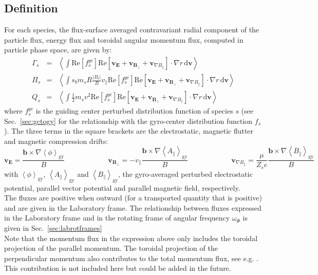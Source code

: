 \documentclass[a4paper]{report}
\begin{document}
\subsection{Definition}
For each species, the flux-surface averaged contravariant radial component of the particle flux, energy flux and toroidal angular momentum flux, computed in particle phase space, are given by:
\begin{eqnarray}
 \Gamma_s &=& \left<\int \textrm{Re}\left[f_s^{gc}\right] \textrm{Re}\left[\mathbf{v}_\mathbf{E} + \mathbf{v}_{\mathbf{B}_\perp} + \mathbf{v}_{\nabla B_\parallel}  \right]\cdot \nabla r\,\textrm{d}\mathbf{v}\right> \\
  \Pi_s   &=& \left<\int s_b m_s R \frac{|B_t|}{B}v_\parallel \textrm{Re}\left[f_s^{gc}\right] \textrm{Re}  \left[\mathbf{v}_\mathbf{E} + \mathbf{v}_{\mathbf{B}_\perp} + \mathbf{v}_{\nabla B_\parallel}  \right] \cdot \nabla r\,\textrm{d}\mathbf{v}\right> \\
      Q_s &=& \left<\int \frac{1}{2}m_sv^2 \textrm{Re}\left[f_s^{gc}\right] \textrm{Re} \left[\mathbf{v}_\mathbf{E} + \mathbf{v}_{\mathbf{B}_\perp} + \mathbf{v}_{\nabla B_\parallel}  \right] \cdot \nabla r\,\textrm{d}\mathbf{v}\right> 
\end{eqnarray}
where $f_s^{gc}$ is the guiding center perturbed distribution function of species $s$ (see Sec.~\ref{sec:gctogy} for the relationship with the gyro-center distribution function $f_s$). The three terms in the square brackets are the electrostatic, magnetic flutter and magnetic compression drifts:
\begin{equation}
 \mathbf{v}_\mathbf{E} = \frac{\mathbf{b}\times \nabla \left<\phi\right>_\textrm{gy} }{B} \qquad \qquad \qquad
 \mathbf{v}_{\mathbf{B}_\perp} = -v_\parallel \frac{\mathbf{b}\times \nabla \left<A_{\parallel}\right>_\textrm{gy}}{B}  \qquad \qquad \qquad
 \mathbf{v}_{\nabla B_\parallel} = \frac{\mu}{Z_s e} \frac{\mathbf{b}\times \nabla \left<B_{\parallel}\right>_\textrm{gy}}{B}
\end{equation}
with $\left<\phi\right>_\textrm{gy}$, $\left<A_{\parallel}\right>_\textrm{gy}$ and $\left<B_{\parallel}\right>_\textrm{gy}$, the gyro-averaged perturbed electrostatic potential, parallel vector potential and parallel magnetic field, respectively. \\
The fluxes are positive when outward (for a transported quantity that is positive) and are given in the Laboratory frame. The relationship between fluxes expressed in the Laboratory frame and in the rotating frame of angular frequency $\omega_\Phi$ is given in Sec.~\ref{sec:labrotframes}\\
Note that the momentum flux in the expression above only includes the toroidal projection of the parallel momentum. The toroidal projection of the perpendicular momentum also contributes to the total momentum flux, see e.g. \cite{Scott:PoP2010}. This contribution is not included here but could be added in the future. 
\end{document}
